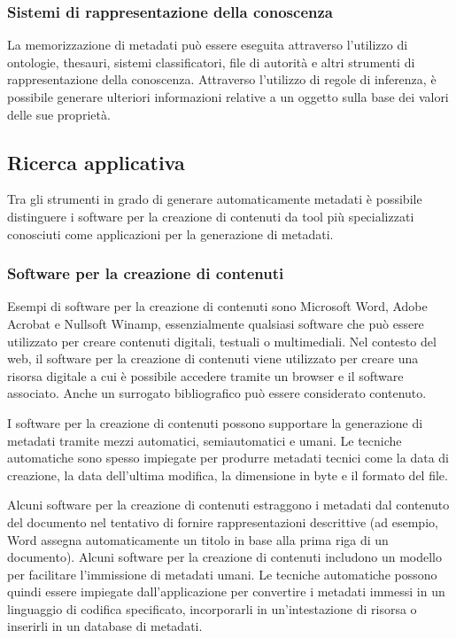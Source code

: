 \subsubsection{Sistemi di rappresentazione della conoscenza}
La memorizzazione di metadati può essere eseguita attraverso l'utilizzo di ontologie, thesauri, sistemi classificatori, file di autorità e altri strumenti di rappresentazione della conoscenza.
Attraverso l'utilizzo di regole di inferenza, è possibile generare ulteriori informazioni relative a un oggetto sulla base dei valori delle sue proprietà.

\subsection{Ricerca applicativa}
Tra gli strumenti in grado di generare automaticamente metadati è possibile distinguere i software per la creazione di contenuti da tool più specializzati conosciuti come applicazioni per la generazione di metadati.

\subsubsection{Software per la creazione di contenuti}
Esempi di software per la creazione di contenuti sono Microsoft Word, Adobe Acrobat e Nullsoft Winamp, essenzialmente qualsiasi software che può essere utilizzato per creare contenuti digitali, testuali o multimediali. Nel contesto del web, il software per la creazione di contenuti viene utilizzato per creare una risorsa digitale a cui è possibile accedere tramite un browser e il software associato. Anche un surrogato bibliografico può essere considerato contenuto.

I software per la creazione di contenuti possono supportare la generazione di metadati tramite mezzi automatici, semiautomatici e umani. Le tecniche automatiche sono spesso impiegate per produrre metadati tecnici come la data di creazione, la data dell'ultima modifica, la dimensione in byte e il formato del file.

Alcuni software per la creazione di contenuti estraggono i metadati dal contenuto del documento nel tentativo di fornire rappresentazioni descrittive (ad esempio, Word assegna automaticamente un titolo in base alla prima riga di un documento). Alcuni software per la creazione di contenuti includono un modello per facilitare l'immissione di metadati umani. Le tecniche automatiche possono quindi essere impiegate dall'applicazione per convertire i metadati immessi in un linguaggio di codifica specificato, incorporarli in un'intestazione di risorsa o inserirli in un database di metadati.

